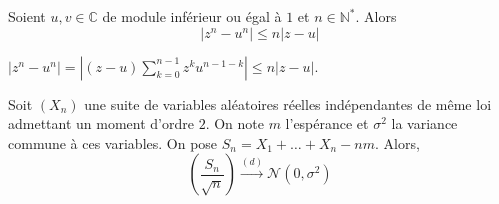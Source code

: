 
	\begin{lemma}
		\label{theoreme-central-limite-2}
		Soient $u, v \in \mathbb{C}$ de module inférieur ou égal à $1$ et $n \in \mathbb{N}^*$. Alors
		\[ |z^n - u^n| \leq n |z-u| \]
	\end{lemma}

	\begin{demonstration}
		$|z^n - u^n| = |(z-u) \sum_{k=0}^{n-1} z^k u^{n-1-k}| \leq n |z-u|$.
	\end{demonstration}

	\begin{theorem}
		Soit $(X_n)$ une suite de variables aléatoires réelles indépendantes de même loi admettant un moment d'ordre $2$. On note $m$ l'espérance et $\sigma^2$ la variance commune à ces variables. On pose $S_n = X_1 + \dots + X_n - nm$. Alors,
		\[ \left ( \frac{S_n}{\sqrt{n}} \right) \overset{(d)}{\longrightarrow} \mathcal{N}(0, \sigma^2) \]
	\end{theorem}

